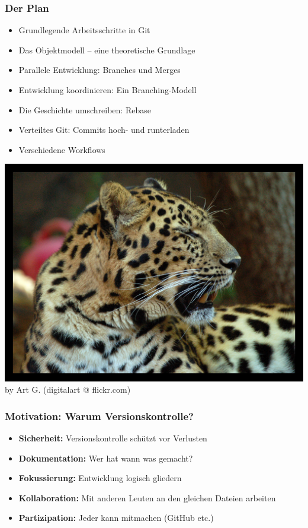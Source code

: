 \documentclass{beamer}
\begin{document}
\begin{frame}
 \frametitle{Der Plan}

 \begin{itemize}
	\item Grundlegende Arbeitsschritte in Git
	\item Das Objektmodell -- eine theoretische Grundlage
	\item Parallele Entwicklung: Branches und Merges
	\item Entwicklung koordinieren: Ein Branching-Modell
	\item Die Geschichte umschreiben: Rebase
	\item Verteiltes Git: Commits hoch- und runterladen
	\item Verschiedene Workflows
\end{itemize}

 \end{frame}
\begin{frame}
	\includegraphics{bilder/yawning_leopard.jpg}\\
	by Art G. (digitalart @ flickr.com)
\end{frame}
\begin{frame}
 \frametitle{Motivation: Warum Versionskontrolle?}

 \begin{itemize}
	\item \textbf{Sicherheit:} Versionskontrolle schützt vor Verlusten
	\item \textbf{Dokumentation:} Wer hat wann was gemacht?
	\item \textbf{Fokussierung:} Entwicklung logisch gliedern
	\item \textbf{Kollaboration:} Mit anderen Leuten an den gleichen Dateien arbeiten
	\item \textbf{Partizipation:} Jeder kann mitmachen (GitHub etc.)
\end{itemize}

 \end{frame}
\end{document}
